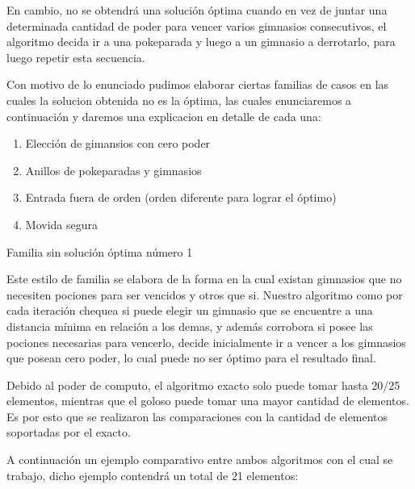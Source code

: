 En cambio, no se obtendr\'a una soluci\'on \'optima cuando en vez de juntar una determinada cantidad de poder para vencer varios gimnasios consecutivos, el algoritmo decida ir a una pokeparada y luego a un gimnasio a derrotarlo, para luego repetir esta secuencia.

Con motivo de lo enunciado pudimos elaborar ciertas familias de casos en las cuales la solucion obtenida no es la \'optima, las cuales enunciaremos a continuaci\'on y daremos una explicacion en detalle de cada una:

\begin{enumerate}
\item Elección de gimansios con cero poder 
\item Anillos de pokeparadas y gimnasios
\item Entrada fuera de orden (orden diferente para lograr el óptimo)
\item Movida segura
\end{enumerate}

\begin{center}
Familia sin soluci\'on \'optima n\'umero 1
\end{center}

Este estilo de familia se elabora de la forma en la cual existan gimnasios que no necesiten pociones para ser vencidos y otros que si. Nuestro algoritmo como por cada iteraci\'on chequea si puede elegir un gimnasio que se encuentre a una distancia m\'inima en relaci\'on a los demas, y adem\'as corrobora si posee las pociones necesarias para vencerlo, decide inicialmente ir a vencer a los gimnasios que posean cero poder, lo cual puede no ser \'optimo para el resultado final.

Debido al poder de computo, el algoritmo exacto solo puede tomar hasta 20/25 elementos, mientras que el goloso puede tomar una mayor cantidad de elementos. Es por esto que se realizaron las comparaciones con la cantidad de elementos soportadas por el exacto.

A continuaci\'on un ejemplo comparativo entre ambos algoritmos con el cual se trabajo, dicho ejemplo contendr\'a un total de 21 elementos:


